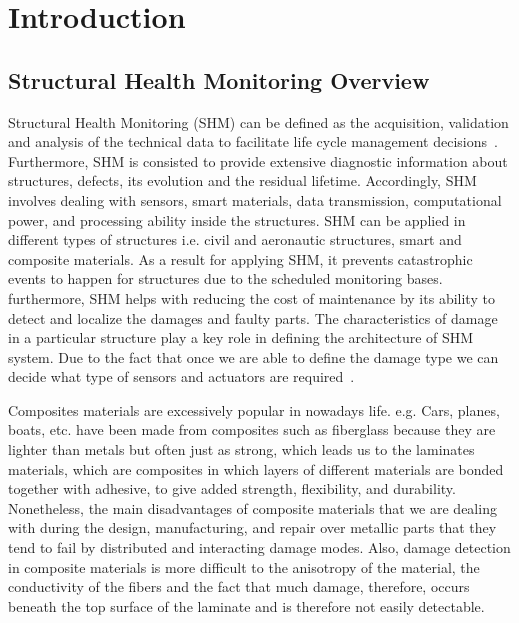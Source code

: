 \documentclass[preprint,10pt]{elsarticle}
\begin{document}
	\section{Introduction}
	\subsection{Structural Health Monitoring Overview}
Structural Health Monitoring (SHM) can be defined as the acquisition, validation and analysis of the technical data to facilitate life cycle management decisions~\cite{R.1999}. Furthermore, SHM is consisted to provide extensive diagnostic information about structures, defects, its evolution and the residual lifetime. Accordingly, SHM involves dealing with sensors, smart materials, data transmission, computational power, and processing ability inside the structures. SHM can be applied in different types of structures i.e. civil and aeronautic structures, smart and composite materials. As a result for applying SHM, it prevents catastrophic events to happen for structures due to the scheduled monitoring bases. furthermore, SHM helps with reducing the cost of maintenance by its ability to detect and localize the damages and faulty parts. The characteristics of damage in a particular structure play a key role in defining the architecture of  SHM system. Due to the fact that once we are able to define the damage type we can decide what type of sensors and actuators are required~\cite{Kessler2002}. 

Composites materials are excessively popular in nowadays life. e.g. Cars, planes, boats, etc. have been made from composites such as fiberglass because they are lighter than metals but often just as strong, which leads us to the laminates materials, which are composites in which layers of different materials are bonded together with adhesive, to give added strength, flexibility, and durability. Nonetheless, the main disadvantages of composite materials that we are dealing with during the design, manufacturing, and repair over metallic parts that they tend to fail by distributed and interacting damage modes. Also, damage detection in composite materials is more difficult to the anisotropy of the material, the conductivity of the fibers and the fact that much damage, therefore, occurs beneath the top surface of the laminate and is therefore not easily detectable.
\end{document}
